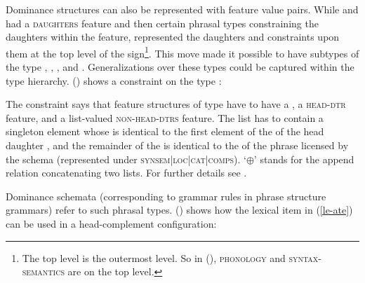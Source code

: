 \documentclass[output=paper
	        ,collection
	        ,collectionchapter
 	        ,biblatex
                ,babelshorthands
                ,newtxmath
                ,draftmode
                ,colorlinks, citecolor=brown
]{langscibook}
\begin{document}
Dominance structures can also be represented with feature value pairs. While \citet{ps} and
\citet{ps2} had a \textsc{daughters} feature and then certain phrasal types constraining the
daughters within the \dtrs feature, \citet{Sag97a} represented the daughters and constraints upon them at
the top level of the sign\footnote{
The top level is the outermost level. So in (), \textsc{phonology} and
\textsc{syntax-semantics} are on the top level.}. 
This move made it possible to have subtypes of the type , \eg
{}, , and
. Generalizations over these types could be captured within the type
hierarchy. () shows a constraint on the type :

\ea
\label{schema-bin-prel}
\z
The constraint says that feature structures of type  have to have a
\synsemv, a \textsc{head-dtr} feature, and a list-valued \textsc{non-head-dtrs} feature. The list has
to contain a singleton element whose \synsemv is identical to the first element of the \compsl
of the head daughter , and the remainder of the \compsl {} is identical to the
\compsv of the phrase licensed by the schema (represented under
\textsc{synsem|loc|cat|comps}). `$\oplus$'\is{$\oplus$} stands for the append relation concatenating
two lists. For further details see .

Dominance schemata (corresponding to grammar rules in phrase structure grammars) refer to such
phrasal types. () shows how the lexical item in (\ref{le-ate}) can be used in a
head-complement configuration:
\end{document}
